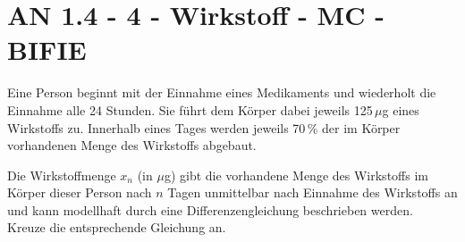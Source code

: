 \section{AN 1.4 - 4 - Wirkstoff - MC - BIFIE}

\begin{beispiel}[AN 1.4]{1} %
Eine Person beginnt mit der Einnahme eines Medikaments und wiederholt die Einnahme alle 24 Stunden. Sie führt dem Körper dabei jeweils 125\,$\mu$g eines Wirkstoffs zu. Innerhalb eines Tages werden jeweils 70\,\% der im Körper vorhandenen Menge des Wirkstoffs abgebaut. 

Die Wirkstoffmenge $x_n$ (in $\mu$g) gibt die vorhandene Menge des Wirkstoffs im Körper dieser Person nach $n$ Tagen unmittelbar nach Einnahme des Wirkstoffs an und kann modellhaft durch eine Differenzengleichung beschrieben werden.\\
Kreuze die entsprechende Gleichung an. 

\end{beispiel}